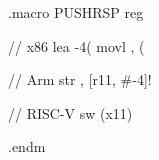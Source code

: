 .macro PUSHRSP reg

// x86
lea -4(%
movl \reg, (%

// Arm
str \reg, [r11, #-4]!

// RISC-V
sw (x11)

.endm


